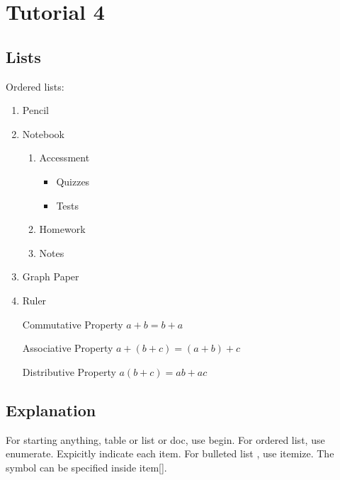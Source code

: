 \documentclass[11pt]{article}
\begin{document}
\section*{Tutorial 4}

\subsection{Lists}
Ordered lists:

\begin{enumerate}
\item Pencil
\item Notebook
	\begin{enumerate}
	\item Accessment
		\begin{itemize}
		\item Quizzes
		\item Tests
		\end{itemize}
	\item Homework
	\item Notes
	\end{enumerate}
\item Graph Paper
\item Ruler
\end{enumerate}

\begin{enumerate}
\item[Commutative Property] $a + b= b + a$
\item[Associative Property] $a + (b +c)=(a+b) + c$
\item[Distributive Property] $a(b+c)=ab+ac$
\end{enumerate}

\subsection*{Explanation}
For starting anything, table or list or doc, use begin. For ordered list, use enumerate. Expicitly indicate each item. For bulleted list , use itemize. The symbol can be specified inside item[].
\end{document}
